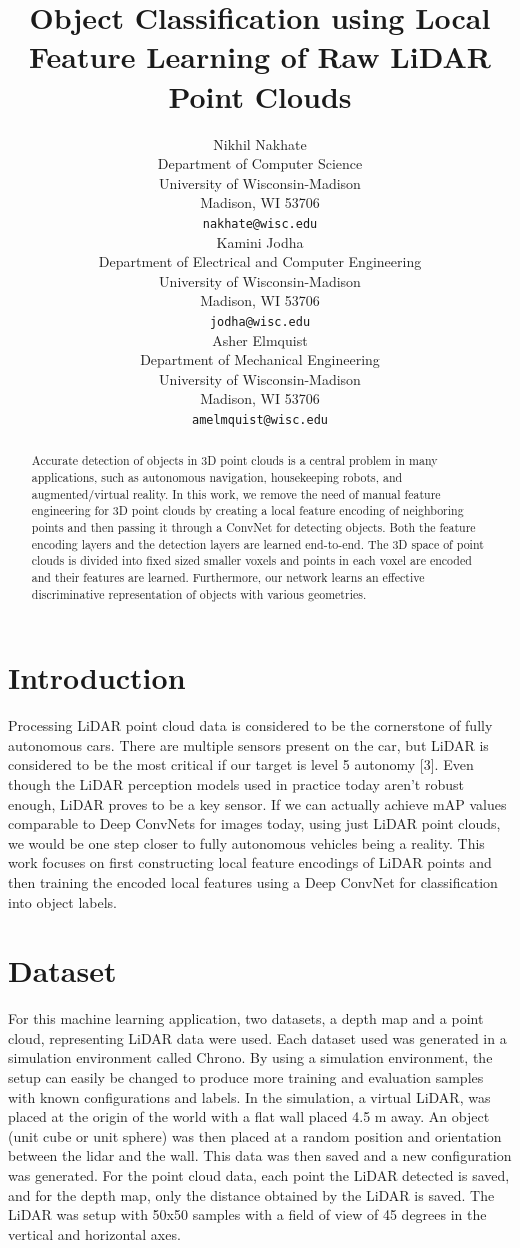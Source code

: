\documentclass{article}
\title{Object Classification using Local Feature Learning of Raw LiDAR Point Clouds}
\author{
  Nikhil Nakhate \\
  Department of Computer Science\\
  University of Wisconsin-Madison\\
  Madison, WI 53706\\
  \texttt{nakhate@wisc.edu} \\
  \And
  Kamini Jodha \\
  Department of Electrical and Computer Engineering\\
  University of Wisconsin-Madison\\
  Madison, WI 53706\\
  \texttt{jodha@wisc.edu} \\
  \AND
  Asher Elmquist \\
  Department of Mechanical Engineering\\
  University of Wisconsin-Madison\\
  Madison, WI 53706\\
  \texttt{amelmquist@wisc.edu} \\
}
\begin{document}

\maketitle

\begin{abstract}
  Accurate detection of objects in 3D point clouds is a central problem in many applications, such as autonomous navigation, housekeeping robots, and augmented/virtual reality. In this work, we remove the need of manual feature engineering for 3D point clouds by creating a local feature encoding of neighboring points and then passing it through a ConvNet for detecting objects. Both the feature encoding layers and the detection layers are learned end-to-end. The 3D space of point clouds is divided into fixed sized smaller voxels and points in each voxel are encoded and their features are learned. Furthermore, our network learns an effective discriminative representation of objects with various geometries.
\end{abstract}

\section{Introduction}
Processing LiDAR point cloud data is considered to be the cornerstone of fully autonomous cars. There are multiple sensors present on the car, but LiDAR is considered to be the most critical if our target is level 5 autonomy [3]. Even though the LiDAR perception models used in practice today aren’t robust enough, LiDAR proves to be a key sensor. If we can actually achieve mAP values comparable to Deep ConvNets for images today, using just LiDAR point clouds, we would be one step closer to fully autonomous vehicles being a reality. This work focuses on first constructing local feature encodings of LiDAR points and then training the encoded local features using a Deep ConvNet for classification into object labels.

\section{Dataset}
For this machine learning application, two datasets, a depth map and a point cloud, representing LiDAR data were used. Each dataset used was generated in a simulation environment called Chrono. By using a simulation environment, the setup can easily be changed to produce more training and evaluation samples with known configurations and labels. In the simulation, a virtual LiDAR, was placed at the origin of the world with a flat wall placed 4.5 m away. An object (unit cube or unit sphere) was then placed at a random position and orientation between the lidar and the wall. This data was then saved and a new configuration was generated. For the point cloud data, each point the LiDAR detected is saved, and for the depth map, only the distance obtained by the LiDAR is saved. The LiDAR was setup with 50x50 samples with a field of view of 45 degrees in the vertical and horizontal axes. 
\end{document}
